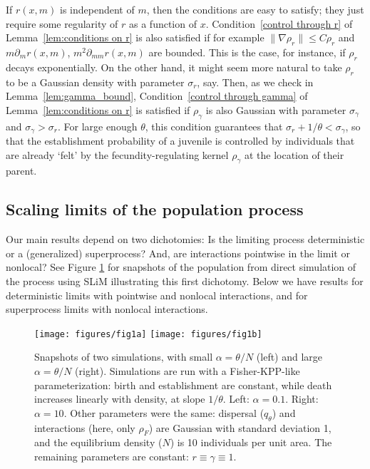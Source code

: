 \documentclass[EJP]{ejpecp} %
\newcommand{\citep}[1]{\cite{#1}}
\begin{document}
If $r(x,m)$ is independent of $m$, then the conditions are easy to 
satisfy; they just require some regularity of $r$ as a function of $x$. 
Condition~\ref{control through r} of Lemma~\ref{lem:conditions on r} is also satisfied if for example
$\|\nabla\rho_r\|\leq C\rho_r$ 
and $m\partial_mr(x,m)$, $m^2\partial_{mm}r(x,m)$ are bounded.
This is the case, for instance, if $\rho_r$ decays exponentially.
On the other hand, it might seem more natural to take $\rho_r$ to be a Gaussian 
density with parameter $\sigma_r$, say. Then, 
as we check in Lemma~\ref{lem:gamma_bound},
Condition~\ref{control through gamma} of Lemma~\ref{lem:conditions on r}
is satisfied if $\rho_\gamma$ is also
Gaussian with parameter $\sigma_\gamma$ and $\sigma_\gamma>\sigma_r$. For large enough
$\theta$, this condition guarantees that 
$\sigma_r+1/\theta <\sigma_\gamma$, so that the establishment probability of a juvenile
is controlled by individuals that are already `felt' by the fecundity-regulating kernel $\rho_\gamma$
at the location of their parent. 


\subsection{Scaling limits of the population process}

Our main results depend on two dichotomies:
Is the limiting process deterministic or a (generalized) superprocess?
And, are interactions pointwise in the limit or nonlocal?
See Figure \ref{fig:super_vs_det_2d} for snapshots of the population
from direct simulation of the process using SLiM \citep{haller_slim_2019}
illustrating this first dichotomy.
Below we have results for deterministic limits with pointwise and nonlocal interactions,
and for superprocess limits with nonlocal interactions.


\begin{figure}
    \begin{center}
        \texttt{[image: figures/fig1a]}
        \texttt{[image: figures/fig1b]}
    \end{center}
    \caption{
        Snapshots of two simulations, with small $\alpha=\theta/N$ (left) and large 
	$\alpha = \theta/N$ (right).
        Simulations are run with a Fisher-KPP-like parameterization:
        birth and establishment are constant, while death increases linearly with density,
        at slope $1/\theta$.
        Left: $\alpha=0.1$. Right: $\alpha=10$.
        Other parameters were the same:
        dispersal ($q_\theta$) and interactions (here, only $\rho_F$)
        are Gaussian with standard deviation 1,
        and the equilibrium density ($N$) is 10 individuals per unit area.
        The remaining parameters are constant: $r \equiv \gamma \equiv 1$.
        \label{fig:super_vs_det_2d}
    }
\end{figure}
\end{document}
